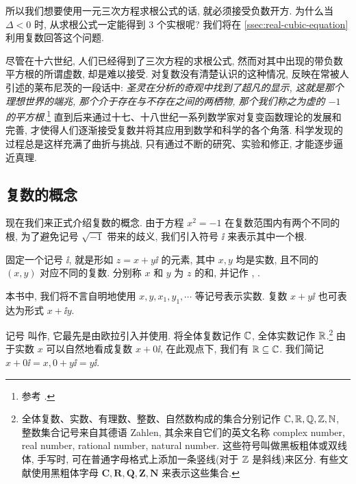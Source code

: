 所以我们想要使用一元三次方程求根公式的话, 就\alert{必须接受负数开方}.
为什么当 $\Delta<0$ 时, 从求根公式一定能得到 $3$ 个实根呢?
我们将在 \ref{ssec:real-cubic-equation}利用复数回答这个问题.

尽管在十六世纪, 人们已经得到了三次方程的求根公式, 然而对其中出现的带负数平方根的所谓虚数, 却是难以接受.
对复数没有清楚认识的这种情况, 反映在常被人引述的莱布尼茨的一段话中: \textcolor{third}{\itshape 圣灵在分析的奇观中找到了超凡的显示, 这就是那个理想世界的端兆, 那个介于存在与不存在之间的两栖物, 那个我们称之为虚的 $-1$ 的平方根.}\footnote{%
  参考 \cite[第13章2节]{Kline1990}.
}
直到后来通过十七、十八世纪一系列数学家对复变函数理论的发展和完善, 才使得人们逐渐接受复数并将其应用到数学和科学的各个角落.
科学发现的过程总是这样充满了曲折与挑战, 只有通过不断的研究、实验和修正, 才能逐步逼近真理.


\subsection{复数的概念}

现在我们来正式介绍复数的概念.
由于方程 $x^2=-1$ 在复数范围内有两个不同的根, 为了避免记号 $\sqrt{-1}$ 带来的歧义, 我们引入符号 $\ii$ 来表示其中一个根.

\begin{definition}
  固定一个记号 $\ii$, 就是形如 $z=x+y\ii$ 的元素, 其中 $x,y$ 均是实数, 且不同的 $(x,y)$ 对应不同的复数.
  分别称 $x$ 和 $y$ 为 $z$ 的和, 并记作 , .
\end{definition}

本书中, 我们将不言自明地使用 $x,y,x_1,y_1,\cdots$ 等记号表示实数.
复数 $x+y\ii$ 也可表达为形式 $x+\ii y$.

记号 \nouns{$\ii$} 叫作, 它最先是由欧拉引入并使用.
将\alert{全体复数记作 ${\mathbb{C}}$}, 全体实数记作 ${\mathbb{R}}$.\footnote{%
  全体复数、实数、有理数、整数、自然数构成的集合分别记作 ${\mathbb{C}},{\mathbb{R}},{\mathbb{Q}},{\mathbb{Z}},{\mathbb{N}}$, 整数集合记号来自其德语 Zahlen, 其余来自它们的英文名称 complex number, real number, rational number, natural number.
  这些符号叫做黑板粗体或双线体, 手写时, 可在普通字母格式上添加一条竖线(对于 ${\mathbb{Z}}$ 是斜线)来区分.
  有些文献使用黑粗体字母 $\mathbf{C,R,Q,Z,N}$ 来表示这些集合.
}
由于实数 $x$ 可以自然地看成复数 $x+0\ii$, 在此观点下, 我们有 ${\mathbb{R}}\subseteq {\mathbb{C}}$.
我们简记 $x+0\ii=x,0+y\ii=y\ii$.

